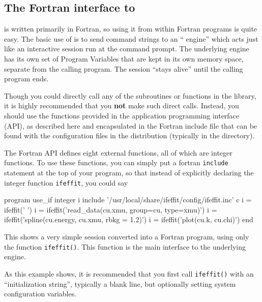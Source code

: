 \subsection{The Fortran interface to {\ifeffit}}\label{Ch:Scripting-f77}

{}
{\ifeffit} is written primarily in Fortran, so using it from within Fortran
programs is quite easy.  The basic use of {\ifeffit} is to send command
strings to an ``{\ifeffit} engine'' which acts just like an interactive
{\ifeffit} session run at the command prompt.  The underlying engine has
its own set of Program Variables that are kept in its own memory space,
separate from the calling program.  The session ``stays alive'' until the
calling program ends.

Though you could directly call any of the subroutines or functions in the
{\ifeffit} library, it is highly recommended that you {\bf{not}} make such
direct calls.  Instead, you should use the functions provided in the
application programming interface (API), as described here and encapsulated
in the Fortran include file {} that can be found with the
configuration files in the {\ifeffit} distribution (typically in the
{} directory).
{}

The {\ifeffit} Fortran API defines eight external functions, all of which
are integer functions.  To use these functions, you can simply put a
fortran {\tt{include}} statement at the top of your program, so that
instead of explicitly declaring the integer function {\tt{ifeffit}}, you
could say 

{\small{
\begin{VerbSBox}
       program use_if
       integer i
       include '/usr/local/share/ifeffit/config/ifeffit.inc'
c
       i = ifeffit(' ')
       i = ifeffit('read_data(cu.xmu, group=cu, type=xmu)')
       i = ifeffit('spline(cu.energy, cu.xmu, rbkg = 1.2)')
       i = ifeffit('plot(cu.k, cu.chi)')
       end    
\end{VerbSBox}
}}\noindent
This shows a very simple {\ifeffit} session converted into a Fortran
program, using only the function {\tt{ifeffit()}}.  This function is the 
main interface to the underlying {\ifeffit} engine.

As this example shows, it is recommended that you first call
{\tt{ifeffit()}} with an ``initialization string'', typically a blank line,
but optionally setting system configuration variables.

